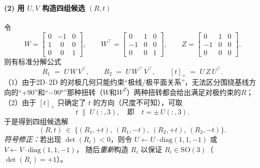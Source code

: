 \documentclass[../main.tex]{subfiles}
\begin{document}
\begin{enumerate}
\begin{itemize}
\begin{enumerate}
\begin{itemize}
\begin{itemize}
\begin{small}
\begin{itemize}
\paragraph{(2) 用 $U,V$ 构造四组候选 $(R,t)$}
令
\[
W=\begin{bmatrix}
0 & -1 & 0\\
1 & \ \ 0 & 0\\
0 & \ \ 0 & 1
\end{bmatrix},
\qquad
W^\top=\begin{bmatrix}
0 & 1 & 0\\
-1 & 0 & 0\\
0 & 0 & 1
\end{bmatrix},
\qquad
Z=\begin{bmatrix}
0 & 1 & 0\\
-1 & 0 & 0\\
0 & 0 & 0
\end{bmatrix}.
\]
则有标准分解公式
\[
R_1 \;=\; U\,W\,V^\top,\qquad
R_2 \;=\; U\,W^\top\,V^\top,\qquad
[t]_\times \;=\; U\,Z\,U^\top.
\]
（1）由于2D–2D 的对极几何只能约束“极线/极平面关系”，无法区分围绕基线方向的“+90”和“−90°”那种扭转（$W\text{和}W^T$）两种扭转都会给出满足对极约束的$R$；\\
（2）由于 $[t]_\times$ 只确定了 $t$ 的方向（尺度不可知），可取
\[
t \;\parallel\; U(:,3),\quad \text{即}\quad t=\pm\,U(:,3).
\]
于是得到四组候选解
\[
(R,t)\ \in\ \big\{(R_1,+t),\ (R_1,-t),\ (R_2,+t),\ (R_2,-t)\big\}.
\]
\emph{符号修正：}若出现 $\det(R_i)<0$，则令 $U\leftarrow U\cdot\mathrm{diag}(1,1,-1)$ 或 $V\leftarrow V\cdot\mathrm{diag}(1,1,-1)$，
随后\emph{重新}构造 $R_i$ 以保证 $R_i\in\mathrm{SO}(3)$（$\det(R_i)=+1$）。



\end{itemize}
\end{small}
\end{itemize}
\end{itemize}
\end{enumerate}
\end{itemize}
\end{enumerate}
\end{document}
